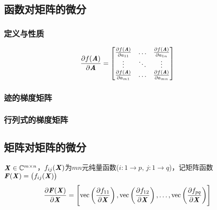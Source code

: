 \subsection{函数对矩阵的微分}
\label{sub:函数对矩阵的微分}

\subsubsection{定义与性质}
\label{ssub:定义与性质}

\begin{definition}
    $$
    \frac{\partial f(\boldsymbol{\mathit{A}})}{\partial \boldsymbol{\mathit{A}}} = \begin{bmatrix}
        \frac{\partial f(\boldsymbol{\mathit{A}})}{\partial a_{11}}     &   \ldots  &   \frac{\partial f(\boldsymbol{\mathit{A}})}{\partial a_{1n}} \\
        \vdots                                      &   \ddots  &   \vdots                                  \\
        \frac{\partial f(\boldsymbol{\mathit{A}})}{\partial a_{m1}}     &   \ldots  &   \frac{\partial f(\boldsymbol{\mathit{A}})}{\partial a_{mn}}
    \end{bmatrix}
    $$
\end{definition}

\subsubsection{迹的梯度矩阵}
\label{ssub:迹的梯度矩阵}

\subsubsection{行列式的梯度矩阵}
\label{ssub:行列式的梯度矩阵}

\subsection{矩阵对矩阵的微分}
\label{sub:矩阵对矩阵的微分}

\begin{definition}[矩阵$\MF(\MX)$对$\MX$的微分]
    $\boldsymbol{\mathit{X}} \in \mathbb{C}^{m \times n}$，$f_{ij}(\boldsymbol{\mathit{X}})$为$mn$元纯量函数($i\colon 1 \to p,\, j\colon 1 \to q$)，记矩阵函数$\boldsymbol{\mathit{F}}(\boldsymbol{\mathit{X}}) = \left( f_{ij}(\boldsymbol{\mathit{X}}) \right)$
    $$
    \frac{\partial \boldsymbol{\mathit{F}}(\boldsymbol{\mathit{X}})}{\partial \boldsymbol{\mathit{X}}} = \left[ \mathrm{vec}\left(\frac{\partial f_{11}}{\partial \boldsymbol{\mathit{X}}}  \right), \mathrm{vec}\left(\frac{\partial f_{12}}{\partial \boldsymbol{\mathit{X}}}  \right), \ldots, \mathrm{vec}\left(\frac{\partial f_{pq}}{\partial \boldsymbol{\mathit{X}}}  \right)  \right]
    $$
\end{definition}

